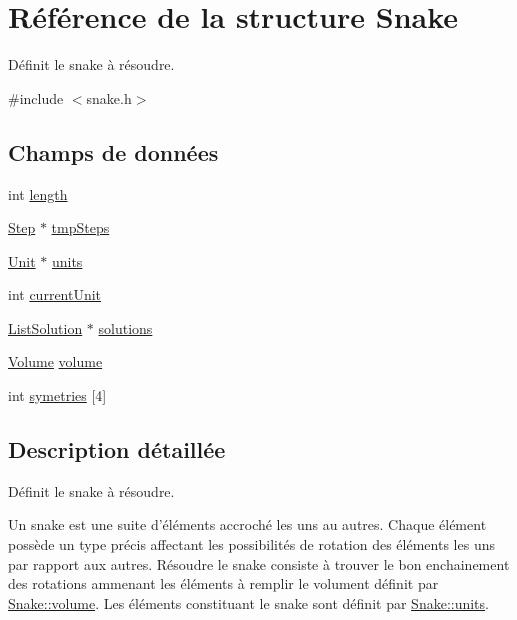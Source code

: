 \hypertarget{struct_snake}{\section{Référence de la structure Snake}
\label{struct_snake}
}


Définit le snake à résoudre.  




{\ttfamily \#include $<$snake.\-h$>$}

\subsection*{Champs de données}
\begin{DoxyCompactItemize}
\item 
int \hyperlink{struct_snake_af9d495c1655d813d553030485d00fea7}{length}
\item 
\hyperlink{struct_step}{Step} $\ast$ \hyperlink{struct_snake_a99a4f4239fb1568fe35d9a081c9b2660}{tmp\-Steps}
\item 
\hyperlink{group___snake_gabceb2331ad056e3c5ad27894199a49ed}{Unit} $\ast$ \hyperlink{struct_snake_a2ff02817760e56a95b3b1bc7cfa1b77b}{units}
\item 
int \hyperlink{struct_snake_a1e5f8a70f50d68340f54ac884c05dcff}{current\-Unit}
\item 
\hyperlink{struct_list_solution}{List\-Solution} $\ast$ \hyperlink{struct_snake_a97be9d71c3998b7a3a97e9403e375979}{solutions}
\item 
\hyperlink{struct_volume}{Volume} \hyperlink{struct_snake_a9bc498ccac8db41438f855f5dd3f4c05}{volume}
\item 
int \hyperlink{struct_snake_af0fd2b78c237d732b558aa24f3a1d68c}{symetries} \mbox{[}4\mbox{]}
\end{DoxyCompactItemize}


\subsection{Description détaillée}
Définit le snake à résoudre. 

Un snake est une suite d'éléments accroché les uns au autres. Chaque élément possède un type précis affectant les possibilités de rotation des éléments les uns par rapport aux autres. Résoudre le snake consiste à trouver le bon enchainement des rotations ammenant les éléments à remplir le volument définit par \hyperlink{struct_snake_a9bc498ccac8db41438f855f5dd3f4c05}{Snake\-::volume}. Les éléments constituant le snake sont définit par \hyperlink{struct_snake_a2ff02817760e56a95b3b1bc7cfa1b77b}{Snake\-::units}. 

